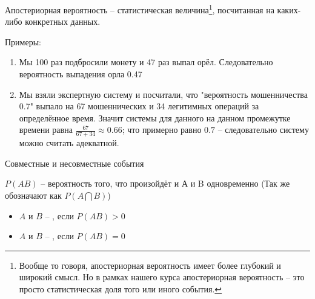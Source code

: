 \begin{frame}{Апостериорная вероятность}
	\small
	 -- статистическая величина\footnote{
		Вообще то говоря, апостериорная вероятность имеет более глубокий и широкий смысл.
		Но в рамках нашего курса апостериорная вероятность -- это просто статистическая доля того или иного события.}, посчитанная на каких-либо конкретных данных.
	
	Примеры: 
	\footnotesize
	\begin{enumerate}
		\item Мы 100 раз подбросили монету и 47 раз выпал орёл. Следовательно 
		вероятность выпадения орла 0.47
		\item Мы взяли экспертную систему и посчитали, что  "вероятность мошенничества 0.7"
		выпало на 67 мошеннических и 34 легитимных операций за определённое время. 
		Значит  системы для данного  на данном промежутке времени равна $\frac{67}{67+34} \approx 0.66$; что примерно равно $0.7$ -- следовательно систему можно считать адекватной.
	\end{enumerate}
\end{frame}

\begin{frame}{Совместные и несовместные события}


$P(AB)$ -- вероятность того, что произойдёт и А и B одновременно
(Так же обозначают как $P(A\bigcap B)$)


\begin{itemize}
	\item $A$ и $B$ -- , если $P(AB) > 0$
	\item $A$ и $B$ -- , если $P(AB) = 0$
\end{itemize}

\end{frame}

